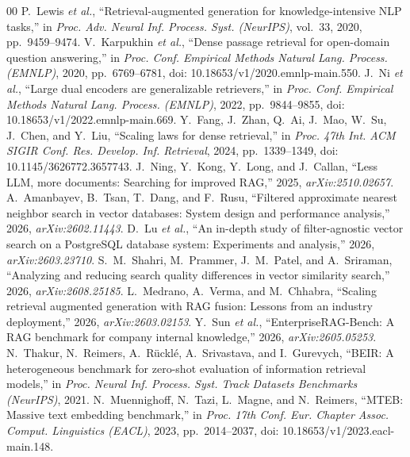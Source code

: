 \documentclass{ieeeaccess}
\makeatletter
\DeclareRobustCommand{\_}{\ifmmode\nfss@text{\textunderscore}\else\textunderscore\allowbreak\fi}
\makeatother
\begin{document}
\begin{thebibliography}{00}
P.~Lewis \emph{et al.}, ``Retrieval-augmented generation for knowledge-intensive NLP tasks,'' in \emph{Proc. Adv. Neural Inf. Process. Syst. (NeurIPS)}, vol.~33, 2020, pp.~9459--9474.
V.~Karpukhin \emph{et al.}, ``Dense passage retrieval for open-domain question answering,'' in \emph{Proc. Conf. Empirical Methods Natural Lang. Process. (EMNLP)}, 2020, pp.~6769--6781, doi: 10.18653/v1/2020.emnlp-main.550.
J.~Ni \emph{et al.}, ``Large dual encoders are generalizable retrievers,'' in \emph{Proc. Conf. Empirical Methods Natural Lang. Process. (EMNLP)}, 2022, pp.~9844--9855, doi: 10.18653/v1/2022.emnlp-main.669.
Y.~Fang, J.~Zhan, Q.~Ai, J.~Mao, W.~Su, J.~Chen, and Y.~Liu, ``Scaling laws for dense retrieval,'' in \emph{Proc. 47th Int. ACM SIGIR Conf. Res. Develop. Inf. Retrieval}, 2024, pp.~1339--1349, doi: 10.1145/3626772.3657743.
J.~Ning, Y.~Kong, Y.~Long, and J.~Callan, ``Less LLM, more documents: Searching for improved RAG,'' 2025, \emph{arXiv:2510.02657}.
A.~Amanbayev, B.~Tsan, T.~Dang, and F.~Rusu, ``Filtered approximate nearest neighbor search in vector databases: System design and performance analysis,'' 2026, \emph{arXiv:2602.11443}.
D.~Lu \emph{et al.}, ``An in-depth study of filter-agnostic vector search on a PostgreSQL database system: Experiments and analysis,'' 2026, \emph{arXiv:2603.23710}.
S.~M.~Shahri, M.~Prammer, J.~M.~Patel, and A.~Sriraman, ``Analyzing and reducing search quality differences in vector similarity search,'' 2026, \emph{arXiv:2608.25185}.
L.~Medrano, A.~Verma, and M.~Chhabra, ``Scaling retrieval augmented generation with RAG fusion: Lessons from an industry deployment,'' 2026, \emph{arXiv:2603.02153}.
Y.~Sun \emph{et al.}, ``EnterpriseRAG-Bench: A RAG benchmark for company internal knowledge,'' 2026, \emph{arXiv:2605.05253}.
N.~Thakur, N.~Reimers, A.~R\"{u}ckl\'{e}, A.~Srivastava, and I.~Gurevych, ``BEIR: A heterogeneous benchmark for zero-shot evaluation of information retrieval models,'' in \emph{Proc. Neural Inf. Process. Syst. Track Datasets Benchmarks (NeurIPS)}, 2021.
N.~Muennighoff, N.~Tazi, L.~Magne, and N.~Reimers, ``MTEB: Massive text embedding benchmark,'' in \emph{Proc. 17th Conf. Eur. Chapter Assoc. Comput. Linguistics (EACL)}, 2023, pp.~2014--2037, doi: 10.18653/v1/2023.eacl-main.148.

\end{thebibliography}
\end{document}
